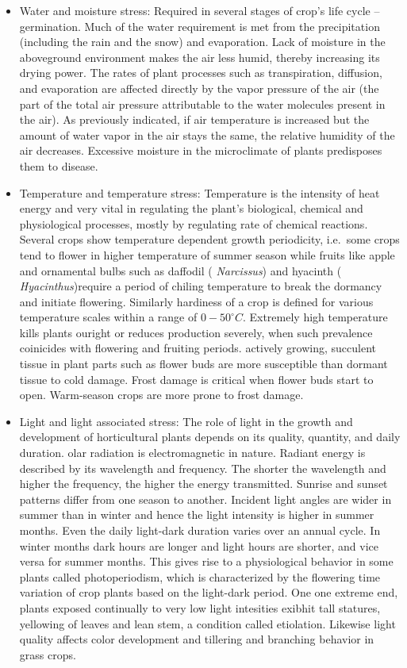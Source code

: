 \documentclass[
  openany]{book}
\begin{document}
\begin{itemize}
\item
  Water and moisture stress: Required in several stages of crop's life cycle -- germination. Much of the water requirement is met from the precipitation (including the rain and the snow) and evaporation. Lack of moisture in the aboveground environment makes the air less humid, thereby increasing its drying power. The rates of plant processes such as transpiration, diffusion, and evaporation are affected directly by the vapor pressure of the air (the part of the total air pressure attributable to the water molecules present in the air). As previously indicated, if air temperature is increased but the amount of water vapor in the air stays the same, the relative humidity of the air decreases. Excessive moisture in the microclimate of plants predisposes them to disease.
\item
  Temperature and temperature stress: Temperature is the intensity of heat energy and very vital in regulating the plant's biological, chemical and physiological processes, mostly by regulating rate of chemical reactions. Several crops show temperature dependent growth periodicity, i.e.~some crops tend to flower in higher temperature of summer season while fruits like apple and ornamental bulbs such as daffodil ( \emph{Narcissus}) and hyacinth ( \emph{Hyacinthus})require a period of chiling temperature to break the dormancy and initiate flowering. Similarly hardiness of a crop is defined for various temperature scales within a range of \(0-50 ^\circ C\). Extremely high temperature kills plants ouright or reduces production severely, when such prevalence coinicides with flowering and fruiting periods. actively growing, succulent tissue in plant parts such as flower buds are more susceptible than dormant tissue to cold damage. Frost damage is critical when flower buds start to open. Warm-season crops are more prone to frost damage.
\item
  Light and light associated stress: The role of light in the growth and development of horticultural plants depends on its quality, quantity, and daily duration. olar radiation is electromagnetic in nature. Radiant energy is described by its wavelength and frequency. The shorter the wavelength and higher the frequency, the higher the energy transmitted. Sunrise and sunset patterns differ from one season to another. Incident light angles are wider in summer than in winter and hence the light intensity is higher in summer months. Even the daily light-dark duration varies over an annual cycle. In winter months dark hours are longer and light hours are shorter, and vice versa for summer months. This gives rise to a physiological behavior in some plants called photoperiodism, which is characterized by the flowering time variation of crop plants based on the light-dark period. One one extreme end, plants exposed continually to very low light intesities exibhit tall statures, yellowing of leaves and lean stem, a condition called etiolation. Likewise light quality affects color development and tillering and branching behavior in grass crops.
\end{itemize}
\end{document}
